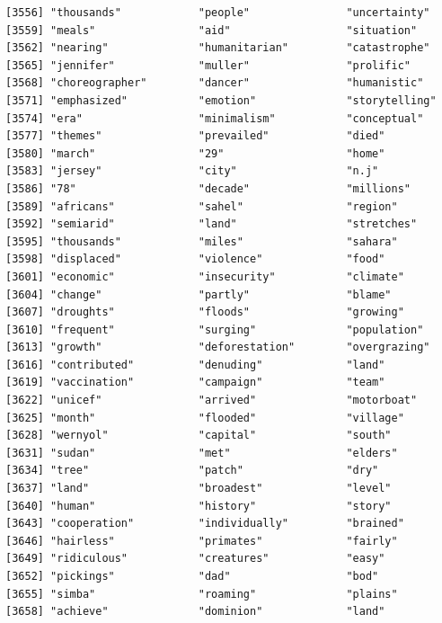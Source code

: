 \documentclass[
  letterpaper,
  DIV=11,
  numbers=noendperiod]{scrartcl}
\begin{document}
\begin{verbatim}
[3556] "thousands"            "people"               "uncertainty"         
[3559] "meals"                "aid"                  "situation"           
[3562] "nearing"              "humanitarian"         "catastrophe"         
[3565] "jennifer"             "muller"               "prolific"            
[3568] "choreographer"        "dancer"               "humanistic"          
[3571] "emphasized"           "emotion"              "storytelling"        
[3574] "era"                  "minimalism"           "conceptual"          
[3577] "themes"               "prevailed"            "died"                
[3580] "march"                "29"                   "home"                
[3583] "jersey"               "city"                 "n.j"                 
[3586] "78"                   "decade"               "millions"            
[3589] "africans"             "sahel"                "region"              
[3592] "semiarid"             "land"                 "stretches"           
[3595] "thousands"            "miles"                "sahara"              
[3598] "displaced"            "violence"             "food"                
[3601] "economic"             "insecurity"           "climate"             
[3604] "change"               "partly"               "blame"               
[3607] "droughts"             "floods"               "growing"             
[3610] "frequent"             "surging"              "population"          
[3613] "growth"               "deforestation"        "overgrazing"         
[3616] "contributed"          "denuding"             "land"                
[3619] "vaccination"          "campaign"             "team"                
[3622] "unicef"               "arrived"              "motorboat"           
[3625] "month"                "flooded"              "village"             
[3628] "wernyol"              "capital"              "south"               
[3631] "sudan"                "met"                  "elders"              
[3634] "tree"                 "patch"                "dry"                 
[3637] "land"                 "broadest"             "level"               
[3640] "human"                "history"              "story"               
[3643] "cooperation"          "individually"         "brained"             
[3646] "hairless"             "primates"             "fairly"              
[3649] "ridiculous"           "creatures"            "easy"                
[3652] "pickings"             "dad"                  "bod"                 
[3655] "simba"                "roaming"              "plains"              
[3658] "achieve"              "dominion"             "land"                

\end{verbatim}
\end{document}
